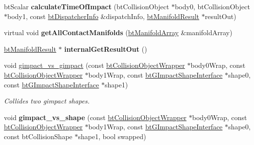 \begin{DoxyCompactItemize}
\item 
\hypertarget{classbt_g_impact_collision_algorithm_a327988a10bfd16b5841ec413130763ae}{bt\+Scalar {\bfseries calculate\+Time\+Of\+Impact} (bt\+Collision\+Object $\ast$body0, bt\+Collision\+Object $\ast$body1, const \hyperlink{structbt_dispatcher_info}{bt\+Dispatcher\+Info} \&dispatch\+Info, \hyperlink{classbt_manifold_result}{bt\+Manifold\+Result} $\ast$result\+Out)}\label{classbt_g_impact_collision_algorithm_a327988a10bfd16b5841ec413130763ae}

\item 
\hypertarget{classbt_g_impact_collision_algorithm_ac635d6eb2bfbdad148479f0fc2d24d9b}{virtual void {\bfseries get\+All\+Contact\+Manifolds} (\hyperlink{classbt_aligned_object_array}{bt\+Manifold\+Array} \&manifold\+Array)}\label{classbt_g_impact_collision_algorithm_ac635d6eb2bfbdad148479f0fc2d24d9b}

\item 
\hypertarget{classbt_g_impact_collision_algorithm_a5fd65bced2a59243765e665855ee7566}{\hyperlink{classbt_manifold_result}{bt\+Manifold\+Result} $\ast$ {\bfseries internal\+Get\+Result\+Out} ()}\label{classbt_g_impact_collision_algorithm_a5fd65bced2a59243765e665855ee7566}

\item 
void \hyperlink{classbt_g_impact_collision_algorithm_a2a6bd5ca4d26e3578d2613543e85429b}{gimpact\+\_\+vs\+\_\+gimpact} (const \hyperlink{structbt_collision_object_wrapper}{bt\+Collision\+Object\+Wrapper} $\ast$body0\+Wrap, const \hyperlink{structbt_collision_object_wrapper}{bt\+Collision\+Object\+Wrapper} $\ast$body1\+Wrap, const \hyperlink{classbt_g_impact_shape_interface}{bt\+G\+Impact\+Shape\+Interface} $\ast$shape0, const \hyperlink{classbt_g_impact_shape_interface}{bt\+G\+Impact\+Shape\+Interface} $\ast$shape1)
\begin{DoxyCompactList}\small\item\em Collides two gimpact shapes. \end{DoxyCompactList}\item 
\hypertarget{classbt_g_impact_collision_algorithm_a41595f270e49daf44f550b6a032dd3b0}{void {\bfseries gimpact\+\_\+vs\+\_\+shape} (const \hyperlink{structbt_collision_object_wrapper}{bt\+Collision\+Object\+Wrapper} $\ast$body0\+Wrap, const \hyperlink{structbt_collision_object_wrapper}{bt\+Collision\+Object\+Wrapper} $\ast$body1\+Wrap, const \hyperlink{classbt_g_impact_shape_interface}{bt\+G\+Impact\+Shape\+Interface} $\ast$shape0, const bt\+Collision\+Shape $\ast$shape1, bool swapped)}\label{classbt_g_impact_collision_algorithm_a41595f270e49daf44f550b6a032dd3b0}


\end{DoxyCompactItemize}
